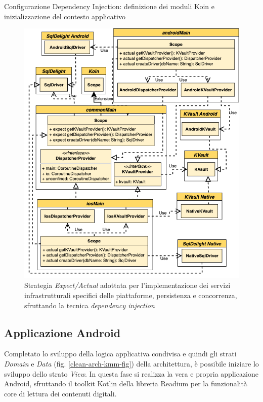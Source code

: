 \begin{listing}[H]
    \inputminted{kotlin}{code/shared-di-koin.kt}
    \caption{Configurazione Dependency Injection: definizione dei moduli Koin e inizializzazione del contesto applicativo}
\end{listing}

\begin{figure}[H]
    \centering
    \includegraphics[width=1\textwidth]{img/expect-actual-shared.png}
    \caption{Strategia \textit{Expect/Actual} adottata per l'implementazione dei servizi infrastrutturali specifici delle piattaforme, persistenza e concorrenza, sfruttando la tecnica \textit{dependency injection}}
\end{figure}

\subsection{Applicazione Android}
Completato lo sviluppo della logica applicativa condivisa e quindi gli strati \textit{Domain} e \textit{Data} (fig. \ref{clean-arch-kmm-fig}) della architettura, è possibile iniziare lo sviluppo dello strato \textit{View}. In questa fase si realizza la vera e propria applicazione Android, sfruttando il toolkit Kotlin della libreria Readium per la funzionalità core di lettura dei contenuti digitali.

